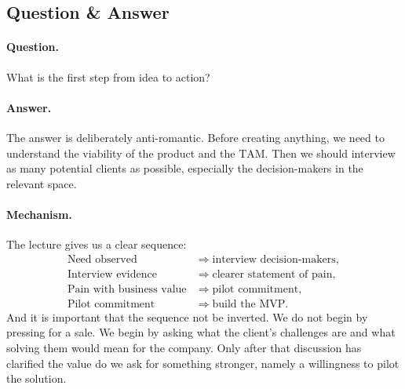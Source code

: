 \subsection{Question \& Answer}

\paragraph{Question.} What is the first step from idea to action?

\paragraph{Answer.} The answer is deliberately anti-romantic. Before creating anything, we need to understand the viability of the product and the \(\mathrm{TAM}\). Then we should interview as many potential clients as possible, especially the decision-makers in the relevant space.

\paragraph{Mechanism.} The lecture gives us a clear sequence:
\begin{align}
\text{Need observed}
&\Rightarrow \text{interview decision-makers},\\
\text{Interview evidence}
&\Rightarrow \text{clearer statement of pain},\\
\text{Pain with business value}
&\Rightarrow \text{pilot commitment},\\
\text{Pilot commitment}
&\Rightarrow \text{build the }\mathrm{MVP}.
\end{align}
And it is important that the sequence not be inverted. We do not begin by pressing for a sale. We begin by asking what the client's challenges are and what solving them would mean for the company. Only after that discussion has clarified the value do we ask for something stronger, namely a willingness to pilot the solution.

